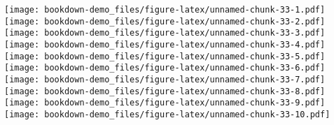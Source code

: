 \documentclass[
]{book}
\newenvironment{Shaded}{\begin{snugshade}}{\end{snugshade}}
\newcommand{\AttributeTok}[1]{\textcolor[rgb]{0.77,0.63,0.00}{#1}}
\newcommand{\ConstantTok}[1]{\textcolor[rgb]{0.00,0.00,0.00}{#1}}
\newcommand{\ControlFlowTok}[1]{\textcolor[rgb]{0.13,0.29,0.53}{\textbf{#1}}}
\newcommand{\DecValTok}[1]{\textcolor[rgb]{0.00,0.00,0.81}{#1}}
\newcommand{\FunctionTok}[1]{\textcolor[rgb]{0.00,0.00,0.00}{#1}}
\newcommand{\NormalTok}[1]{#1}
\newcommand{\OtherTok}[1]{\textcolor[rgb]{0.56,0.35,0.01}{#1}}
\newcommand{\SpecialCharTok}[1]{\textcolor[rgb]{0.00,0.00,0.00}{#1}}
\newcommand{\StringTok}[1]{\textcolor[rgb]{0.31,0.60,0.02}{#1}}
\begin{document}
\begin{Shaded}
\end{Shaded}

\texttt{[image: bookdown-demo\_files/figure-latex/unnamed-chunk-33-1.pdf]} \texttt{[image: bookdown-demo\_files/figure-latex/unnamed-chunk-33-2.pdf]} \texttt{[image: bookdown-demo\_files/figure-latex/unnamed-chunk-33-3.pdf]} \texttt{[image: bookdown-demo\_files/figure-latex/unnamed-chunk-33-4.pdf]} \texttt{[image: bookdown-demo\_files/figure-latex/unnamed-chunk-33-5.pdf]} \texttt{[image: bookdown-demo\_files/figure-latex/unnamed-chunk-33-6.pdf]} \texttt{[image: bookdown-demo\_files/figure-latex/unnamed-chunk-33-7.pdf]} \texttt{[image: bookdown-demo\_files/figure-latex/unnamed-chunk-33-8.pdf]} \texttt{[image: bookdown-demo\_files/figure-latex/unnamed-chunk-33-9.pdf]} \texttt{[image: bookdown-demo\_files/figure-latex/unnamed-chunk-33-10.pdf]}
\end{document}
